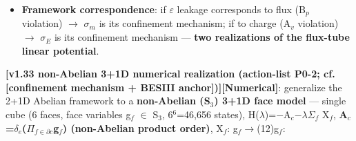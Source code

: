 \documentclass[12pt]{article}
\newcommand{\mtag}[1]{\textbf{[#1]}}
\newcommand{\up}[1]{\ensuremath{^{#1}}}
\newcommand{\down}[1]{\ensuremath{_{#1}}}
\begin{document}
\begin{itemize}
\item \textbf{Framework correspondence}: if \ensuremath{\varepsilon} leakage corresponds to flux (B\down{p} violation) \ensuremath{\to} \ensuremath{\sigma}\down{m} is its confinement mechanism; if to charge (A\down{v} violation) \ensuremath{\to} \ensuremath{\sigma}\down{E} is its confinement mechanism --- \textbf{two realizations of the flux-tube linear potential}.
\end{itemize}

\textbf{\mtag{v1.33 non-Abelian 3+1D numerical realization (action-list P0-2; cf. \mtag{confinement mechanism + BESIII anchor})}}\mtag{Numerical}: generalize the 2+1D Abelian framework to a \textbf{non-Abelian (S\down{3}) 3+1D face model} --- single cube (6 faces, face variables g\down{f} \ensuremath{\in} S\down{3}, 6\up{6}=46,656 states), H(\ensuremath{\lambda})=\ensuremath{-}A\down{c}\ensuremath{-}\ensuremath{\lambda}\ensuremath{\Sigma}\down{f} X\down{f}, \textbf{A\down{c}=\ensuremath{\delta}\down{e}(\ensuremath{\Pi}\down{f\in{}\partial{}c}g\down{f}) (non-Abelian product order)}, X\down{f}: g\down{f}\ensuremath{\to}(12)g\down{f}:
\end{document}
